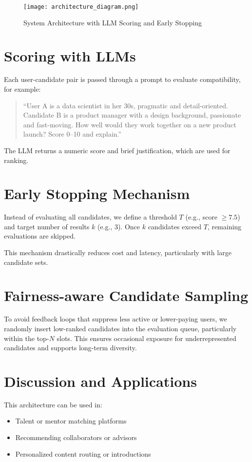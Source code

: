 \documentclass[11pt]{article}
\begin{document}
\begin{figure}[h!]
    \centering
    \texttt{[image: architecture\_diagram.png]} %
    \caption{System Architecture with LLM Scoring and Early Stopping}
\end{figure}

\section{Scoring with LLMs}
Each user-candidate pair is passed through a prompt to evaluate compatibility, for example:

\begin{quote}
``User A is a data scientist in her 30s, pragmatic and detail-oriented. Candidate B is a product manager with a design background, passionate and fast-moving. How well would they work together on a new product launch? Score 0--10 and explain.''
\end{quote}

The LLM returns a numeric score and brief justification, which are used for ranking.

\section{Early Stopping Mechanism}
Instead of evaluating all candidates, we define a threshold $T$ (e.g., score $\geq 7.5$) and target number of results $k$ (e.g., 3). Once $k$ candidates exceed $T$, remaining evaluations are skipped.

This mechanism drastically reduces cost and latency, particularly with large candidate sets.

\section{Fairness-aware Candidate Sampling}
To avoid feedback loops that suppress less active or lower-paying users, we randomly insert low-ranked candidates into the evaluation queue, particularly within the top-$N$ slots. This ensures occasional exposure for underrepresented candidates and supports long-term diversity.

\section{Discussion and Applications}
This architecture can be used in:

\begin{itemize}
    \item Talent or mentor matching platforms
    \item Recommending collaborators or advisors
    \item Personalized content routing or introductions
\end{itemize}
\end{document}
